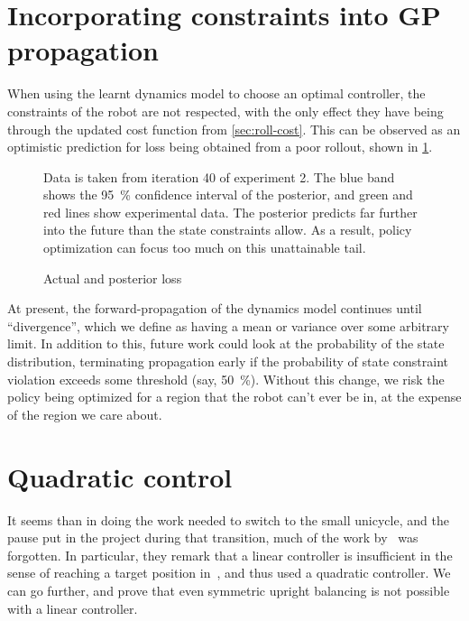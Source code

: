 \documentclass[main.tex]{subfiles}
\begin{document}
\section{Incorporating constraints into GP propagation}

	When using the learnt dynamics model to choose an optimal controller, the constraints of the robot are not respected, with the only effect they have being through the updated cost function from \cref{sec:roll-cost}.
	This can be observed as an optimistic prediction for loss being obtained from a poor rollout, shown in \cref{fig:loss-prediction}.
	\begin{figure}[b!]
		\begin{minipage}{\linewidth/2-1em}
			
		\end{minipage}\hfill%
		\begin{minipage}{\linewidth/2-1em}
			\caption{Actual and posterior loss}
			\label{fig:loss-prediction}
			\small
			\medskip
			Data is taken from iteration 40 of experiment 2.
			The blue band shows the \SI{95}{\percent} confidence interval of the posterior, and green and red lines show experimental data.
			The posterior predicts far further into the future than the state constraints allow.
			As a result, policy optimization can focus too much on this unattainable tail.
		\end{minipage}
	\end{figure}
	At present, the forward-propagation of the dynamics model continues until \enquote{divergence}, which we define as having a mean or variance over some arbitrary limit.
	In addition to this, future work could look at the probability of the state distribution, terminating propagation early if the probability of state constraint violation exceeds some threshold (say, \SI{50}{\percent}).
	Without this change, we risk the policy being optimized for a region that the robot can't ever be in, at the expense of the region we care about.

\section{Quadratic control}

	It seems than in doing the work needed to switch to the small unicycle, and the pause put in the project during that transition, much of the work by~\citeauthor{queiro} was forgotten.
	In particular, they remark that a linear controller is insufficient in the sense of reaching a target position in~\cite[fig.~8]{queiro}, and thus used a quadratic controller.
	We can go further, and prove that even symmetric upright balancing is not possible with a linear controller.
\end{document}
